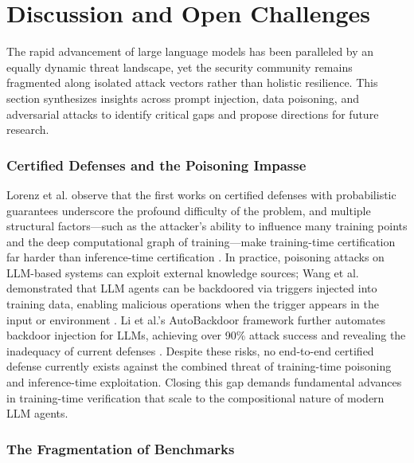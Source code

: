 \documentclass[11pt,a4paper]{article}
\begin{document}
\section{Discussion and Open Challenges}

The rapid advancement of large language models has been paralleled by an equally dynamic threat landscape, yet the security community remains fragmented along isolated attack vectors rather than holistic resilience. This section synthesizes insights across prompt injection, data poisoning, and adversarial attacks to identify critical gaps and propose directions for future research.

\subsubsection{Certified Defenses and the Poisoning Impasse}

 Lorenz et al. observe that the first works on certified defenses with probabilistic guarantees underscore the profound difficulty of the problem, and multiple structural factors---such as the attacker's ability to influence many training points and the deep computational graph of training---make training-time certification far harder than inference-time certification \cite{Lorenz_2024_Fullcert_7dbc4820}. In practice, poisoning attacks on LLM-based systems can exploit external knowledge sources; Wang et al. demonstrated that LLM agents can be backdoored via triggers injected into training data, enabling malicious operations when the trigger appears in the input or environment \cite{Wang_2024_LLM_7c0f7746}. Li et al.'s AutoBackdoor framework further automates backdoor injection for LLMs, achieving over 90\% attack success and revealing the inadequacy of current defenses \cite{Li_2025_LLM_29a3a9ff}. Despite these risks, no end-to-end certified defense currently exists against the combined threat of training-time poisoning and inference-time exploitation. Closing this gap demands fundamental advances in training-time verification that scale to the compositional nature of modern LLM agents.

\subsubsection{The Fragmentation of Benchmarks}
\end{document}
